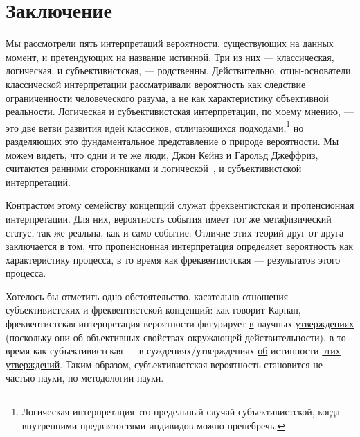 \documentclass[14pt]{extarticle}
\begin{document}
\section*{Заключение}
Мы рассмотрели пять интерпретаций вероятности, существующих на данных момент, и претендующих на название истинной. Три из них --- классическая, логическая, и субъективистская, --- родственны. Действительно, отцы-основатели классической интерпретации рассматривали вероятность как следствие ограниченности человеческого разума, а не как характеристику объективной реальности. Логическая и субъективистская интерпретации, по моему мнению, --- это две ветви развития идей классиков, отличающихся подходами,\footnote{Логическая интерпретация это предельный случай субъективистской, когда внутренними предвзятостями индивидов можно пренебречь.} но разделяющих это фундаментальное представление о природе вероятности. Мы можем видеть, что одни и те же люди, Джон Кейнз и Гарольд Джеффриз, считаются ранними сторонниками и логической~\cite[раз. 3.2 пар. 2]{Hajek}, и субъективистской~\cite[стр. 5--7]{Carnap} интерпретаций.

Контрастом этому семейству концепций служат фреквентистская и пропенсионная интерпретации. Для них, вероятность события имеет тот же метафизический статус, так же реальна, как и само событие. Отличие этих теорий  друг от друга заключается в том, что пропенсионная интерпретация определяет вероятность как характеристику процесса, в то время как фреквентистская --- результатов этого процесса.

Хотелось бы отметить одно обстоятельство, касательно отношения субъективистских и фреквентистской концепций: как говорит Карнап,~\cite[стр. 7]{Carnap} фреквентистская интерпретация вероятности фигурирует \underline{в} научных \underline{утверждениях} (поскольку они об объективных свойствах окружающей действительности), в то время как субъективистская --- в суждениях/утверждениях \underline{об} истинности \underline{этих утверждений}. Таким образом, субъективистская вероятность становится не частью науки, но методологии науки.
\end{document}
